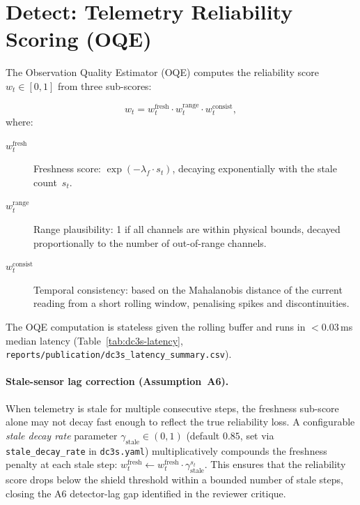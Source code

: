 \section{Detect: Telemetry Reliability Scoring (OQE)}
\label{sec:detect}

The Observation Quality Estimator (OQE) computes the reliability score
$w_t \in [0, 1]$ from three sub-scores:

\begin{equation}
\label{eq:oqe}
  w_t = w_t^{\mathrm{fresh}} \cdot w_t^{\mathrm{range}} \cdot w_t^{\mathrm{consist}},
\end{equation}
where:
\begin{description}
  \item[$w_t^{\mathrm{fresh}}$] Freshness score: $\exp(-\lambda_f \cdot s_t)$,
    decaying exponentially with the stale count~$s_t$.
  \item[$w_t^{\mathrm{range}}$] Range plausibility: 1 if all channels are
    within physical bounds, decayed proportionally to the number of
    out-of-range channels.
  \item[$w_t^{\mathrm{consist}}$] Temporal consistency: based on the
    Mahalanobis distance of the current reading from a short rolling window,
    penalising spikes and discontinuities.
\end{description}

The OQE computation is stateless given the rolling buffer and runs in
$<0.03$\,ms median latency
(Table~\ref{tab:dc3s-latency}, \texttt{reports/publication/dc3s\_latency\_summary.csv}).

\paragraph{Stale-sensor lag correction (Assumption~A6).}
When telemetry is stale for multiple consecutive steps, the freshness
sub-score alone may not decay fast enough to reflect the true reliability
loss.  A configurable \emph{stale decay rate} parameter
$\gamma_{\mathrm{stale}} \in (0,1)$ (default $0.85$, set via
\texttt{stale\_decay\_rate} in \texttt{dc3s.yaml}) multiplicatively
compounds the freshness penalty at each stale step:
$w_t^{\mathrm{fresh}} \leftarrow w_t^{\mathrm{fresh}} \cdot \gamma_{\mathrm{stale}}^{s_t}$.
This ensures that the reliability score drops below the shield threshold
within a bounded number of stale steps, closing the A6 detector-lag gap
identified in the reviewer critique.

